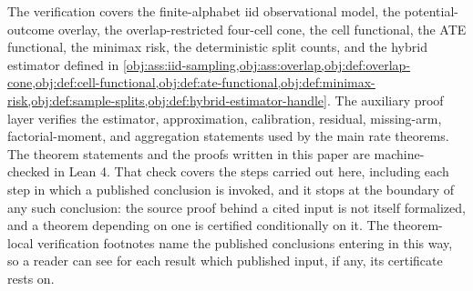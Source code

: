 The verification covers the finite-alphabet iid observational model, the potential-outcome overlay, the overlap-restricted four-cell cone, the cell functional, the ATE functional, the minimax risk, the deterministic split counts, and the hybrid estimator defined in \cref{obj:ass:iid-sampling,obj:ass:overlap,obj:def:overlap-cone,obj:def:cell-functional,obj:def:ate-functional,obj:def:minimax-risk,obj:def:sample-splits,obj:def:hybrid-estimator-handle}. The auxiliary proof layer verifies the estimator, approximation, calibration, residual, missing-arm, factorial-moment, and aggregation statements used by the main rate theorems. The theorem statements and the proofs written in this paper are machine-checked in Lean 4. That check covers the steps carried out here, including each step in which a published conclusion is invoked, and it stops at the boundary of any such conclusion: the source proof behind a cited input is not itself formalized, and a theorem depending on one is certified conditionally on it. The theorem-local verification footnotes name the published conclusions entering in this way, so a reader can see for each result which published input, if any, its certificate rests on.
